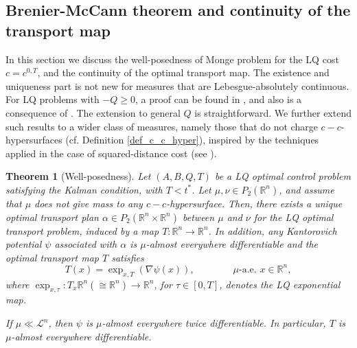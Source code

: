 \documentclass[reqno]{amsart}
\theoremstyle{plain}
\newtheorem{thm}{Theorem}[section]
\theoremstyle{definition}
\theoremstyle{remark}
\begin{document}
    \subsection{Brenier-McCann theorem and continuity of the transport map}
    In this section we discuss the well-posedness of Monge problem for the LQ cost $c=c^{0,T}$, and the continuity of the optimal transport map. The existence and uniqueness part is not new for measures that are Lebesgue-absolutely continuous. For LQ problems with $-Q\geq 0$, a proof can be found in \cite{hinpomriff2011}, and also is a consequence of \cite[Theorem 4.1]{agrachev2007opttransnonholconst}. The extension to general $Q$ is straightforward. We further extend such results to a wider class of measures, namely those that do not charge $c-c$-hypersurfaces (cf. Definition \ref{def_c_c_hyper}), inspired by the techniques applied in the case of squared-distance cost (see \cite{GangboMcCann1996,GigliInverseBrenier2009}).
    \begin{thm}[Well-posedness]\label{Brenier_McCann}
        Let $(A,B,Q,T)$ be a LQ optimal control problem satisfying the Kalman condition, with $T<t^*$. Let $\mu,\nu\in P_2(\mathbb{R}^n)$, and assume that $\mu$ does not give mass to any $c-c$-hypersurface. Then, there exists a unique optimal transport plan $\alpha\in P_2(\mathbb{R}^n\times\mathbb{R}^n)$ between $\mu$ and $\nu$ for the LQ optimal transport problem, induced by a map $T:\mathbb{R}^n\to\mathbb{R}^n$.
        In addition, any Kantorovich potential $\psi$ associated with $\alpha$ is $\mu$-almost everywhere differentiable and the optimal transport map $T$ satisfies
        \begin{equation}
            T(x)=\exp_{x,T}(\nabla\psi(x)),\qquad\qquad \mu\text{-a.e. }x\in\mathbb{R}^n,
        \end{equation}
        where $\exp_{x,\tau}:T_x\mathbb{R}^n(\cong\mathbb{R}^n)\to\mathbb{R}^n$, for $\tau\in[0,T]$, denotes the LQ exponential map.

        If $\mu\ll\mathscr{L}^n$, then $\psi$ is $\mu$-almost everywhere twice differentiable. In particular, $T$ is $\mu$-almost everywhere differentiable.
	\end{thm}
\end{document}
